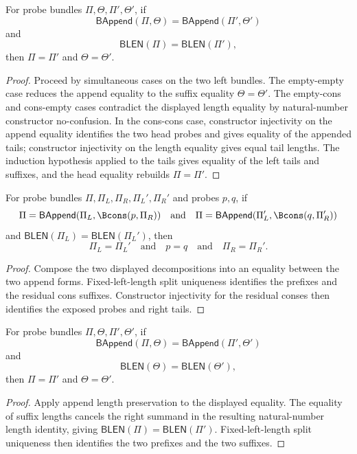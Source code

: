 \begin{theorem}
\label{thm:bundle-append-split-unique-fixed-length}
For probe bundles $\Pi,\Theta,\Pi',\Theta'$, if
$$
\mathsf{BAppend}(\Pi,\Theta)=\mathsf{BAppend}(\Pi',\Theta')
$$
and
$$
\mathsf{BLEN}(\Pi)=\mathsf{BLEN}(\Pi'),
$$
then $\Pi=\Pi'$ and $\Theta=\Theta'$.
\end{theorem}
\begin{proof}
Proceed by simultaneous cases on the two left bundles. The empty-empty case reduces the append equality to the suffix equality $\Theta=\Theta'$. The empty-cons and cons-empty cases contradict the displayed length equality by natural-number constructor no-confusion. In the cons-cons case, constructor injectivity on the append equality identifies the two head probes and gives equality of the appended tails; constructor injectivity on the length equality gives equal tail lengths. The induction hypothesis applied to the tails gives equality of the left tails and suffixes, and the head equality rebuilds $\Pi=\Pi'$.
\end{proof}

\begin{theorem}
\label{thm:inbundle-member-split-unique-fixed-prefix-length}
For probe bundles $\Pi,\Pi_L,\Pi_R,\Pi_L',\Pi_R'$ and probes $p,q$, if
$$
\Pi=\mathsf{BAppend}(\Pi_L,\Bcons(p,\Pi_R))
\quad\text{and}\quad
\Pi=\mathsf{BAppend}(\Pi_L',\Bcons(q,\Pi_R'))
$$
and $\mathsf{BLEN}(\Pi_L)=\mathsf{BLEN}(\Pi_L')$, then
$$
\Pi_L=\Pi_L'
\quad\text{and}\quad
p=q
\quad\text{and}\quad
\Pi_R=\Pi_R'.
$$
\end{theorem}
\begin{proof}
Compose the two displayed decompositions into an equality between the two
append forms. Fixed-left-length split uniqueness identifies the prefixes and
the residual cons suffixes. Constructor injectivity for the residual conses
then identifies the exposed probes and right tails.
\end{proof}

\begin{theorem}
\label{thm:bundle-append-split-unique-fixed-suffix-length}
For probe bundles $\Pi,\Theta,\Pi',\Theta'$, if
$$
\mathsf{BAppend}(\Pi,\Theta)=\mathsf{BAppend}(\Pi',\Theta')
$$
and
$$
\mathsf{BLEN}(\Theta)=\mathsf{BLEN}(\Theta'),
$$
then $\Pi=\Pi'$ and $\Theta=\Theta'$.
\end{theorem}
\begin{proof}
Apply append length preservation to the displayed equality. The equality of
suffix lengths cancels the right summand in the resulting natural-number length
identity, giving $\mathsf{BLEN}(\Pi)=\mathsf{BLEN}(\Pi')$. Fixed-left-length
split uniqueness then identifies the two prefixes and the two suffixes.
\end{proof}

